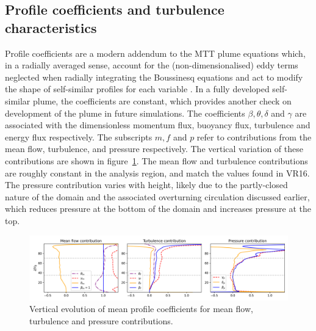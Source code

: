 \documentclass[a4paper]{article}
\begin{document}
\subsection{Profile coefficients and turbulence characteristics}
Profile coefficients are a modern addendum to the MTT plume equations which, in a radially averaged sense,
account for the (non-dimensionalised) eddy terms neglected when radially integrating the Boussinesq equations
and act to modify the shape of self-similar profiles for each variable \citep{craske2015}. In a fully
developed self-similar plume, the coefficients are constant, which provides another check on development of
the plume in future simulations.  The coefficients $\beta, \theta, \delta$ and $\gamma$ are associated with
the dimensionless momentum flux, buoyancy flux, turbulence and energy flux respectively. The subscripts $m, f$
and $p$ refer to contributions from the mean flow, turbulence, and pressure respectively. The vertical
variation of these contributions are shown in figure~\ref{fig:profilecoeff}. The mean flow and turbulence
contributions are roughly constant in the analysis region, and match the values found in VR16. The pressure
contribution varies with height, likely due to the partly-closed nature of the domain and the associated
overturning circulation discussed earlier, which reduces pressure at the bottom of the domain and increases
pressure at the top.

\begin{figure}
	\centering
	\includegraphics[width=\textwidth]{mvr/fig10}
	\caption{Vertical evolution of mean profile coefficients for mean flow, turbulence and pressure
	contributions.}
	\label{fig:profilecoeff}
\end{figure}
\end{document}
